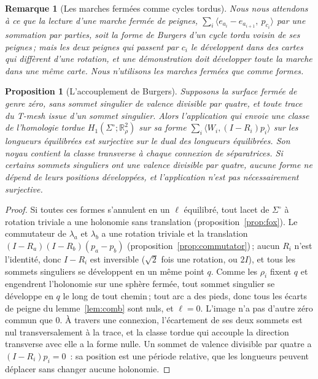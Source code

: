 \documentclass[11pt,a4paper]{article}
\newtheorem{proposition}{Proposition}
\newtheorem{remark}{Remarque}
\newcommand{\R}{\mathbb{R}}
\begin{document}
\begin{remark}[Les marches fermées comme cycles tordus]
Nous nous attendons à ce que la lecture d'une marche fermée de peignes,
$\sum_i \langle e_{a_i} - e_{a_{i+1}},\ p_{c_i}\rangle$ par une sommation par
parties, soit la forme de Burgers d'un cycle tordu voisin de ses peignes\,;
mais les deux peignes qui passent par $c_i$ le développent dans des cartes qui
diffèrent d'une rotation, et une démonstration doit développer toute la
marche dans une même carte. Nous n'utilisons les marches fermées que comme
formes.
\end{remark}

\begin{proposition}[L'accouplement de Burgers]\label{prop:pairing}
Supposons la surface fermée de genre zéro, sans sommet singulier de valence
divisible par quatre, et toute trace du T-mesh issue d'un sommet singulier.
Alors l'application qui envoie une classe de l'homologie tordue
$H_1(\Sigma^\circ; \R^2_\rho)$ sur sa forme $\sum_i \langle W_i, (I - R_i)p_i
\rangle$ sur les longueurs équilibrées est surjective sur le dual des
longueurs équilibrées. Son noyau contient la classe transverse à chaque
connexion de séparatrices. Si certains sommets singuliers ont une valence
divisible par quatre, aucune forme ne dépend de leurs positions développées,
et l'application n'est pas nécessairement surjective.
\end{proposition}

\begin{proof}
Si toutes ces formes s'annulent en un $\ell$ équilibré, tout lacet de
$\Sigma^\circ$ à rotation triviale a une holonomie sans translation
(proposition~\ref{prop:fox}). Le commutateur de $\lambda_a$ et $\lambda_b$ a
une rotation triviale et la translation $(I - R_a)(I - R_b)(p_a - p_b)$
(proposition~\ref{prop:commutator})\,; aucun $R_i$ n'est l'identité, donc $I
- R_i$ est inversible ($\sqrt2$ fois une rotation, ou $2I$), et tous les
sommets singuliers se développent en un même point $q$. Comme les $\rho_i$
fixent $q$ et engendrent l'holonomie sur une sphère fermée, tout sommet
singulier se développe en $q$ le long de tout chemin\,; tout arc a des pieds,
donc tous les écarts de peigne du lemme~\ref{lem:comb} sont nuls, et $\ell =
0$. L'image n'a pas d'autre zéro commun que $0$. À travers une connexion,
l'écartement de ses deux sommets est nul transversalement à la trace, et la
classe tordue qui accouple la direction transverse avec elle a la forme
nulle. Un sommet de valence divisible par quatre a $(I - R_i)p_i = 0$~: sa
position est une période relative, que les longueurs peuvent déplacer sans
changer aucune holonomie.
\end{proof}
\end{document}
